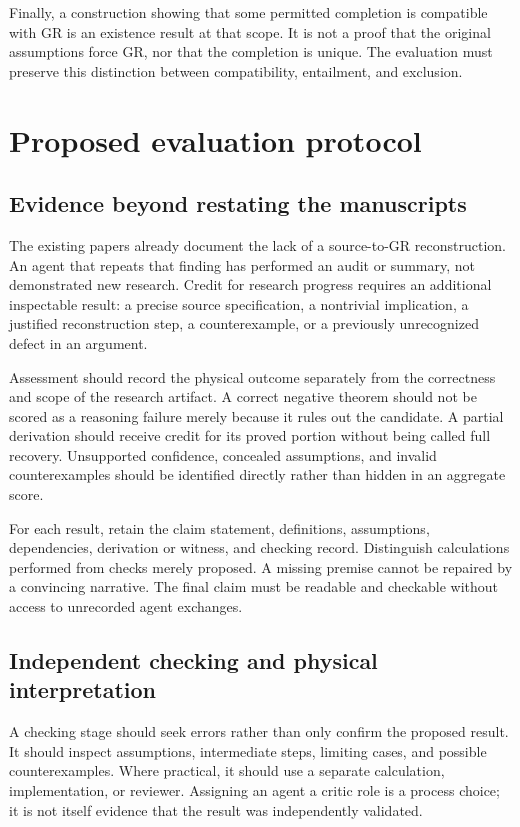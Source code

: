 \documentclass[11pt]{article}
\begin{document}
Finally, a construction showing that some permitted completion is compatible with GR is an existence result at that scope. It is not a proof that the original assumptions force GR, nor that the completion is unique. The evaluation must preserve this distinction between compatibility, entailment, and exclusion.

\section{Proposed evaluation protocol}
\subsection{Evidence beyond restating the manuscripts}
The existing papers already document the lack of a source-to-GR reconstruction. An agent that repeats that finding has performed an audit or summary, not demonstrated new research. Credit for research progress requires an additional inspectable result: a precise source specification, a nontrivial implication, a justified reconstruction step, a counterexample, or a previously unrecognized defect in an argument.

Assessment should record the physical outcome separately from the correctness and scope of the research artifact. A correct negative theorem should not be scored as a reasoning failure merely because it rules out the candidate. A partial derivation should receive credit for its proved portion without being called full recovery. Unsupported confidence, concealed assumptions, and invalid counterexamples should be identified directly rather than hidden in an aggregate score.

For each result, retain the claim statement, definitions, assumptions, dependencies, derivation or witness, and checking record. Distinguish calculations performed from checks merely proposed. A missing premise cannot be repaired by a convincing narrative. The final claim must be readable and checkable without access to unrecorded agent exchanges.

\subsection{Independent checking and physical interpretation}
A checking stage should seek errors rather than only confirm the proposed result. It should inspect assumptions, intermediate steps, limiting cases, and possible counterexamples. Where practical, it should use a separate calculation, implementation, or reviewer. Assigning an agent a critic role is a process choice; it is not itself evidence that the result was independently validated.
\end{document}
